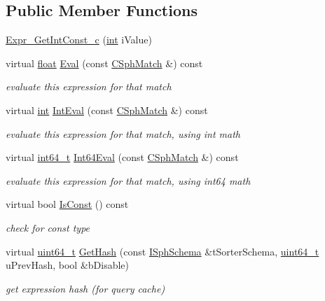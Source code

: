 \subsection*{Public Member Functions}
\begin{DoxyCompactItemize}
\item 
\hyperlink{structExpr__GetIntConst__c_a17b8a33dbfbd7a49eb0c6a14fda03f83}{Expr\-\_\-\-Get\-Int\-Const\-\_\-c} (\hyperlink{sphinxexpr_8cpp_a4a26e8f9cb8b736e0c4cbf4d16de985e}{int} i\-Value)
\item 
virtual \hyperlink{sphinxexpr_8cpp_a0e0d0739f7035f18f949c2db2c6759ec}{float} \hyperlink{structExpr__GetIntConst__c_aada9b7c608b907cba931f4ac3703353e}{Eval} (const \hyperlink{classCSphMatch}{C\-Sph\-Match} \&) const 
\begin{DoxyCompactList}\small\item\em evaluate this expression for that match \end{DoxyCompactList}\item 
virtual \hyperlink{sphinxexpr_8cpp_a4a26e8f9cb8b736e0c4cbf4d16de985e}{int} \hyperlink{structExpr__GetIntConst__c_ac3628a5590a48e6beda274b11a2a86a2}{Int\-Eval} (const \hyperlink{classCSphMatch}{C\-Sph\-Match} \&) const 
\begin{DoxyCompactList}\small\item\em evaluate this expression for that match, using int math \end{DoxyCompactList}\item 
virtual \hyperlink{sphinxstd_8h_a996e72f71b11a5bb8b3b7b6936b1516d}{int64\-\_\-t} \hyperlink{structExpr__GetIntConst__c_ac49f9426d129fbedc0ad31cef959c3f5}{Int64\-Eval} (const \hyperlink{classCSphMatch}{C\-Sph\-Match} \&) const 
\begin{DoxyCompactList}\small\item\em evaluate this expression for that match, using int64 math \end{DoxyCompactList}\item 
virtual bool \hyperlink{structExpr__GetIntConst__c_a4e395a9a41d17cac59539ce35360c407}{Is\-Const} () const 
\begin{DoxyCompactList}\small\item\em check for const type \end{DoxyCompactList}\item 
virtual \hyperlink{sphinxstd_8h_aaa5d1cd013383c889537491c3cfd9aad}{uint64\-\_\-t} \hyperlink{structExpr__GetIntConst__c_a5bb19bda6f2205cd5b396deabaa17a38}{Get\-Hash} (const \hyperlink{classISphSchema}{I\-Sph\-Schema} \&t\-Sorter\-Schema, \hyperlink{sphinxstd_8h_aaa5d1cd013383c889537491c3cfd9aad}{uint64\-\_\-t} u\-Prev\-Hash, bool \&b\-Disable)
\begin{DoxyCompactList}\small\item\em get expression hash (for query cache) \end{DoxyCompactList}\end{DoxyCompactItemize}
